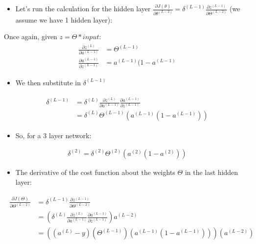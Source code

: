 \documentclass[a4paper,12pt]{report}
\begin{document}
\begin{appendices}
\begin{itemize}
\item Let's run the calculation for the hidden layer $\frac{\partial J(\theta)}{\partial \theta^{(L-2)}} = \delta^{(L-1)} \frac{\partial z^{(L-1)}}{\partial \Theta^{(L-2)}}$ (we assume we have 1 hidden layer):
\end{itemize}
Once again, given $z=\Theta*input$:
\begin{align}
\begin{split}
\frac{\partial z^{(L)}}{\partial a^{(L-1)}} &= \Theta^{(L-1)} \\
\frac{\partial a^{(L-1)}}{\partial z^{(L-1)}} &= a^{(L-1)} (1-a^{(L-1)}
\end{split}
\end{align}
\begin{itemize}
\item We then substitute in $\delta^{(L-1)}$
\end{itemize}
\begin{align}
\begin{split}
\delta^{(L-1)} &= \delta^{(L)}\frac{\partial z^{(L)}}{\partial a^{(L-1)}} \frac{\partial a^{(L-1)}}{\partial z^{(L-1)}} \\
&=\delta^{(L)} \Theta^{(L-1)}(a^{(L-1)}(1- a^{(L-1)}))
\end{split}
\end{align}
\begin{itemize}
\item So, for a 3 layer network:
\end{itemize}
\begin{align}
\delta^{(2)} = \delta^{(2)} \Theta^{(2)}(a^{(2)}(1- a^{(2)}))
\end{align}
\begin{itemize}
\item The derivative of the cost function about the weights $\Theta$ in the last hidden layer:
\end{itemize}
\begin{align}
\begin{split}
\frac{\partial J(\Theta)}{\partial \Theta ^{(L-2)}} &= \delta^{(L-1)} \frac{\partial z^{(L-1)}}{\partial \Theta^{(L-2)}} \\
&= (\delta^{(L)} \frac{\partial z^{(L)}}{\partial a^{(L-1)}} \frac{\partial a^{(L-1)}}{\partial z^{(L-1)}})a^{(L-2)} \\
&=((a^{(L)}-y)(\Theta^{(L-1)})(a^{(L-1)}(1-a^{(L-1)})))(a^{(L-2)})
\end{split}
\end{align}


\end{appendices}
\end{document}
